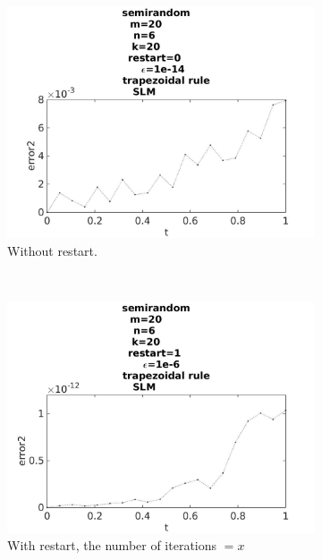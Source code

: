 \begin{figure}[H]
        \begin{subfigure}[b]{0.3\textwidth}
                \includegraphics[width=\textwidth]{../MATLAB/fig/errortestrestart0.jpg}
                \caption{ Without restart. }
                \label{fig:errortestrestart0}
        \end{subfigure}
        ~
        \begin{subfigure}[b]{0.3\textwidth}
                \includegraphics[width=\textwidth]{../MATLAB/fig/errortestrestart2.jpg}
                \caption{ With restart, the number of iterations $= x$ }
                \label{fig:errortestrestart2}
        \end{subfigure}
        ~
        \begin{subfigure}[b]{0.3\textwidth}

\end{subfigure}
\end{figure}
